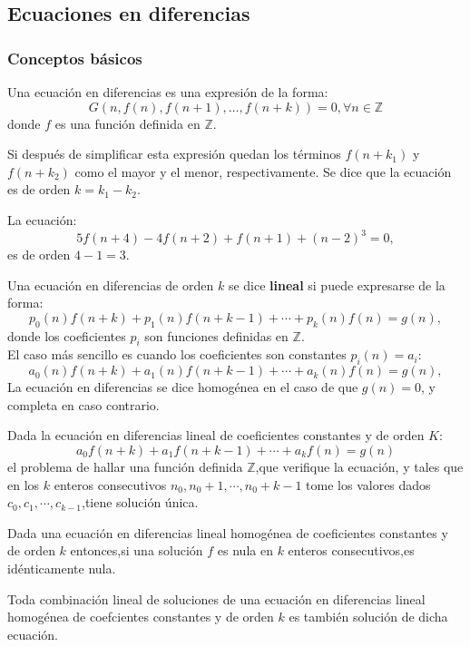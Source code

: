 \subsection{Ecuaciones en diferencias}
\subsubsection{Conceptos básicos}
Una ecuación en diferencias es una expresión de la forma: \[ G\left(n,f(n),f(n+1),\ldots,f(n+k)\right)=0,\forall n\in\mathds{Z} \] donde $f$ es una función definida en $\mathds{Z}$.

Si después de simplificar esta expresión quedan los términos $f\left(n+k_{1}\right)$ y $f\left(n+k_{2}\right)$ como el mayor y el menor, respectivamente. Se dice que la ecuación es de orden $k=k_{1}-k_{2}$.
\begin{example}
	La ecuación:\\
	$$
	5f(n+4)-4f(n+2)+f(n+1)+(n-2)^{3}=0,
	$$
	es de orden $ 4-1=3 .$
\end{example}
Una ecuación en diferencias de orden $ k $ se dice {\bf lineal} si puede expresarse de la forma:\\
$$
p_{0}(n)f(n+k)+p_{1}(n)f(n+k-1)+\cdots+p_{k}(n)f(n)=g(n),
$$
donde los coeficientes $ p_{i} $ son funciones definidas en $ \mathds{Z}.$\\
El caso más sencillo es cuando los coeficientes son constantes $ p_{i}(n)=a_{i} :$\\
$$
a_{0}(n)f(n+k)+a_{1}(n)f(n+k-1)+\cdots+a_{k}(n)f(n)=g(n),
$$
La ecuación en diferencias se dice homogénea en el caso de que $ g(n)=0 $, y completa en caso contrario.
\begin{theorem}
	Dada la ecuación en diferencias lineal de coeficientes constantes y de orden $ K $:
	$$
	a_{0}f(n+k)+a_{1}f(n+k-1)+\cdots+a_{k}f(n)=g(n)
	$$
	el problema de hallar una función definida $ \mathds{Z} $,que verifique la ecuación, y tales que en los $ k $ enteros consecutivos $ n_{0},n_{0}+1,\cdots,n_{0}+k-1 $ tome los valores dados $ c_{0},c_{1},\cdots,c_{k-1}$,tiene solución única.
\end{theorem}
\begin{theorem}
	Dada una ecuación en diferencias lineal homogénea de coeficientes constantes y de orden $ k $ entonces,si una solución $ f $ es nula en $ k $ enteros consecutivos,es idénticamente nula.
\end{theorem}
\begin{theorem}
	Toda combinación lineal de soluciones de una ecuación en diferencias lineal	homogénea de coefcientes constantes y de orden $ k $ es también solución de dicha ecuación.
\end{theorem}
